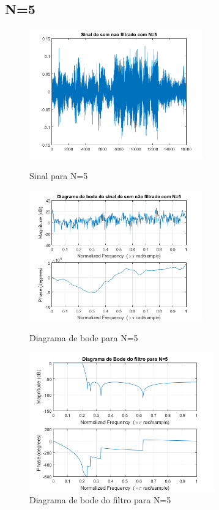 \documentclass[11pt]{article}
\begin{document}
\subsection{N=5}
\begin{figure}[h]
\begin{center}
\begin{minipage}[b]{0.45\linewidth}
\includegraphics[width=7.5cm]{nfds5.png}
\caption{Sinal para N=5}
\label{figura8}
\end{minipage}
\begin{minipage}[b]{0.45\linewidth}
\includegraphics[width=7.5cm]{nfdb5.png}
\caption{Diagrama de bode para N=5}
\label{figura9}
\end{minipage}
\newline
\newline
\includegraphics[width=8cm]{filtro5.png}
\caption{Diagrama de bode do filtro para N=5}
\label{figura10}
\end{center}
\end{figure}
\end{document}

